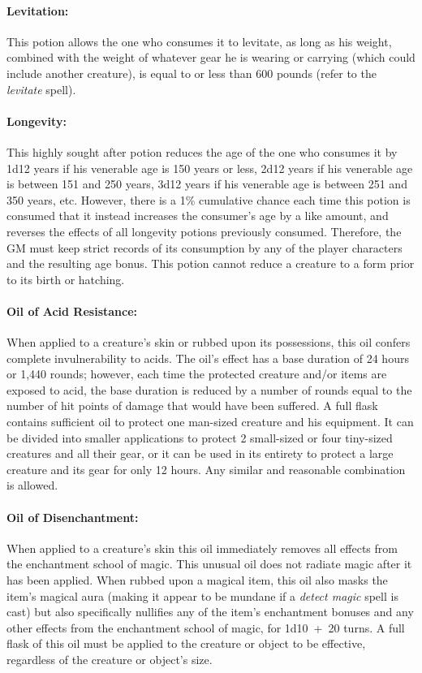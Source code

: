 \begin{multicols}{2}
\paragraph{Levitation:} This potion allows the one who consumes it to levitate, as long as his weight, combined with the weight of whatever gear he is wearing or carrying (which could include another creature), is equal to or less than 600 pounds (refer to the \textit{levitate} spell).

\paragraph{Longevity:} This highly sought after potion reduces the age of the one who consumes it by 1d12 years if his venerable age is 150 years or less, 2d12 years if his venerable age is between 151 and 250 years, 3d12 years if his venerable age is between 251 and 350 years, etc.  However, there is a 1\% cumulative chance each time this potion is consumed that it instead increases the consumer's age by a like amount, and reverses the effects of all longevity potions previously consumed.  Therefore, the GM must keep strict records of its consumption by any of the player characters and the resulting age bonus.  This potion cannot reduce a creature to a form prior to its birth or hatching.

\paragraph{Oil of Acid Resistance:} When applied to a creature's skin or rubbed upon its possessions, this oil confers complete invulnerability to acids.  The oil's effect has a base duration of 24 hours or 1,440 rounds; however, each time the protected creature and/or items are exposed to acid, the base duration is reduced by a number of rounds equal to the number of hit points of damage that would have been suffered.  A full flask contains sufficient oil to protect one man-sized creature and his equipment.  It can be divided into smaller applications to protect 2 small-sized or four tiny-sized creatures and all their gear, or it can be used in its entirety to protect a large creature and its gear for only 12 hours.  Any similar and reasonable combination is allowed.

\paragraph{Oil of Disenchantment:} When applied to a creature's skin this oil immediately removes all effects from the enchantment school of magic.  This unusual oil does not radiate magic after it has been applied.  When rubbed upon a magical item, this oil also masks the item's magical aura (making it appear to be mundane if a \textit{detect magic} spell is cast) but also specifically nullifies any of the item's enchantment bonuses and any other effects from the enchantment school of magic, for 1d10~+~20 turns.  A full flask of this oil must be applied to the creature or object to be effective, regardless of the creature or object's size. 


\end{multicols}
